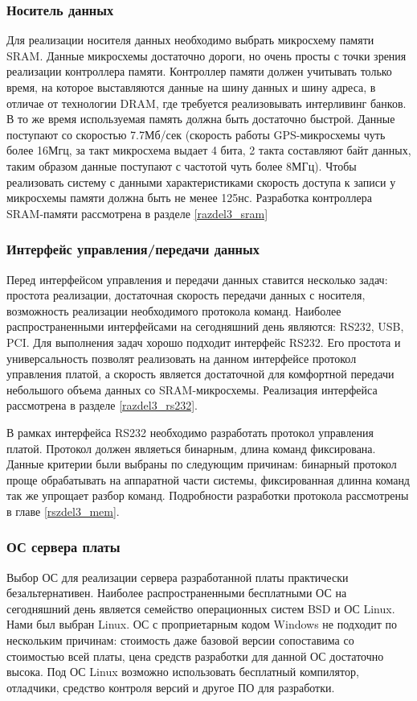 \subsubsection{Носитель данных}
\label{razdel1_sram}
Для реализации носителя данных необходимо выбрать микросхему памяти SRAM. Данные микросхемы достаточно дороги,
но очень просты с точки зрения реализации контроллера памяти. Контроллер памяти должен учитывать только время,
на которое выставляются данные на шину данных и шину адреса, в отличае от технологии DRAM, где требуется реализовывать
интерливинг банков. В то же время используемая память должна быть достаточно быстрой. Данные поступают со
скоростью 7.7Мб/сек (скорость работы GPS-микросхемы чуть более 16Мгц, за такт микросхема выдает 4 бита, 2 такта
составляют байт данных, таким образом данные поступают с частотой чуть более 8МГц). Чтобы реализовать систему
с данными характеристиками скорость доступа к записи у микросхемы памяти должна быть не менее 125нс.
Разработка контроллера SRAM-памяти рассмотрена в разделе \ref{razdel3_sram}

\subsubsection{Интерфейс управления/передачи данных}
\label{razdel1_rs232}
Перед интерфейсом управления и передачи данных ставится несколько задач: простота реализации, достаточная скорость передачи данных с
носителя, возможность реализации необходимого протокола команд. Наиболее распространенными интерфейсами на сегодняшний день
являются: RS232, USB, PCI. Для выполнения задач хорошо подходит интерфейс RS232. Его простота и универсальность позволят
реализовать на данном интерфейсе протокол управления платой, а скорость является достаточной для комфортной передачи 
небольшого объема данных со SRAM-микросхемы. Реализация интерфейса рассмотрена в разделе \ref{razdel3_rs232}.

В рамках интерфейса RS232 необходимо разработать протокол управления платой. Протокол должен являеться
бинарным, длина команд фиксирована.
Данные критерии были выбраны по следующим причинам: бинарный протокол проще обрабатывать на аппаратной части системы,
фиксированная длинна команд так же упрощает разбор команд. 
Подробности разработки протокола рассмотрены в главе \ref{rszdel3_mem}.

\subsubsection{ОС сервера платы}
\label{razdel1_os}
Выбор ОС для реализации сервера разработанной платы практически безальтернативен. Наиболее распространенными бесплатными ОС
на сегодняшний день является семейство операционных систем BSD и ОС Linux. Нами был выбран Linux. ОС с проприетарным кодом Windows
не подходит по нескольким причинам: стоимость даже базовой версии сопоставима со стоимостью всей платы, цена средств разработки
для данной ОС достаточно высока. Под ОС Linux возможно использовать бесплатный компилятор, отладчики, средство контроля версий
и другое ПО для разработки.

